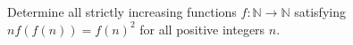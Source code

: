 Determine all strictly increasing functions $f: \mathbb{N}\to\mathbb{N}$ satisfying $nf(f(n))=f(n)^2$ for all positive integers $n$.